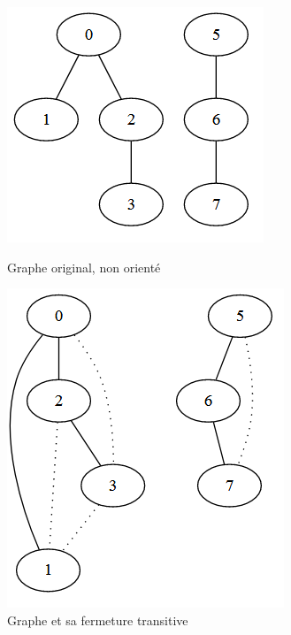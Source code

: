 \begin{figure}[H]
  \centering
  \begin{minipage}[b]{0.4\textwidth}
    \includegraphics[width=\textwidth]{imgs/graph.PNG}
    \caption{Graphe original, non orienté}
  \end{minipage}
  \hfill
  \begin{minipage}[b]{0.4\textwidth}
    \includegraphics[width=\textwidth]{imgs/graphFT.PNG}
    \caption{Graphe et sa fermeture transitive}
  \end{minipage}
\end{figure}

